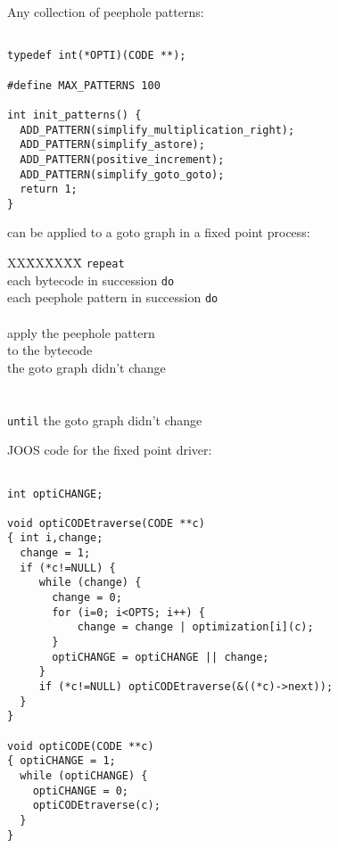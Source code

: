 \begin{slide*}
Any collection of peephole patterns:

\begin{scriptsize}
\begin{verbatim}

typedef int(*OPTI)(CODE **);

#define MAX_PATTERNS 100

int init_patterns() {
  ADD_PATTERN(simplify_multiplication_right);
  ADD_PATTERN(simplify_astore);
  ADD_PATTERN(positive_increment);
  ADD_PATTERN(simplify_goto_goto);
  return 1;
}
\end{verbatim}
\end{scriptsize}

can be applied to a goto graph in a fixed point process:

\begin{small}
\begin{tabbing}
XX\=XX\=XX\=XX\=\kill
{\tt repeat}\\
 each bytecode in succession {\tt do}\\
\> each peephole pattern in succession {\tt do}\\
\>\>\\
\>\>\>\>apply the peephole pattern\\
\>\>\>\>to the bytecode\\
\>\> the goto graph didn't change\\
\>\\
\\
{\tt until} the goto graph didn't change
\end{tabbing}
\end{small}
\vfil
\end{slide*}

\begin{slide*}

JOOS code for the fixed point driver:

\begin{scriptsize}
\begin{verbatim}

int optiCHANGE;
 
void optiCODEtraverse(CODE **c)
{ int i,change;
  change = 1;
  if (*c!=NULL) {
     while (change) {
       change = 0;
       for (i=0; i<OPTS; i++) {
           change = change | optimization[i](c);
       }
       optiCHANGE = optiCHANGE || change;
     }
     if (*c!=NULL) optiCODEtraverse(&((*c)->next));
  }
} 
 
void optiCODE(CODE **c)
{ optiCHANGE = 1;
  while (optiCHANGE) {
    optiCHANGE = 0;
    optiCODEtraverse(c);
  }
}
\end{verbatim}
\end{scriptsize}

\vfil
\end{slide*}
 

